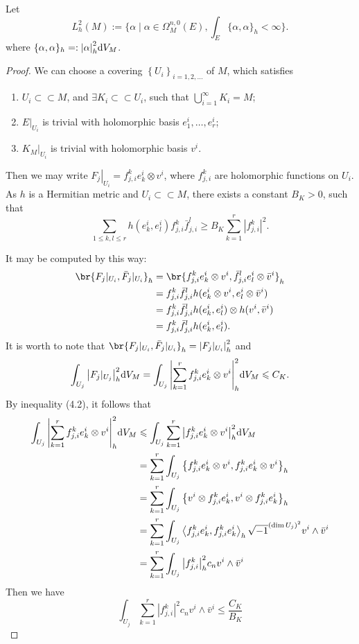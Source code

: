 Let 
\[
  L^2_h(M):=\biggl\{\alpha\mid \alpha\in \Omega^{n,0}_M(E),\int_E \{\alpha,\alpha\}_h<\infty\biggr\}.
\]
where $\{\alpha,\alpha\}_h=:\abs{\alpha}_h^2 \dd V_M$.
\begin{proof}
  We can choose a covering $\left\{U_i\right\}_{i=1,2, \ldots}$ of $M$, which satisfies
  \begin{enumerate}[label=(\arabic*)]
    \item $U_i \subset \subset M$, and $\exists K_i \subset \subset U_i$, such that $\bigcup_{i=1}^{\infty} K_i=M$;
    \item $\left.E\right|_{U_i}$ is trivial with holomorphic basis $e_1^i, \ldots, e_r^i$;
    \item $\left.K_M\right|_{U_i}$ is trivial with holomorphic basis $v^i$.
  \end{enumerate}

Then we may write $\left.F_j\right|_{U_i}=f_{j, i}^k e_k^i \otimes v^i$, where $f_{j, i}^k$ are holomorphic functions on $U_i$. As $h$ is a Hermitian metric and $U_i \subset \subset M$, there exists a constant $B_K>0$, such that
$$
\sum_{1 \leq k, l \leq r} h\left(e_k^i, e_l^i\right) f_{j, i}^k \bar{f}_{j, i}^l \geq B_K \sum_{k=1}^r\left|f_{j, i}^k\right|^2 .
$$

It may be computed by this way:
\begin{align*}
  \br{F_j|_{U_i},\bar{F}_j|_{U_i}}_h &= \br{f_{j, i}^k e_k^i \otimes v^i,\bar{f}_{j, i}^l e_l^i \otimes \bar{v}^i}_h\\ 
  &=f_{j, i}^k\bar{f}_{j, i}^l  h(e_k^i \otimes v^i, e_l^i \otimes \bar{v}^i)\\ 
  &=f_{j, i}^k\bar{f}_{j, i}^l  h(e_k^i , e_l^i )\otimes h(v^i,\bar{v}^i)\\ 
  &=f_{j, i}^k\bar{f}_{j, i}^l  h(e_k^i , e_l^i ).
\end{align*}
  It is worth to note that $\br{F_j|_{U_i},\bar{F}_j|_{U_i}}_h=\abs{F_j|_{U_i}}^2_h$ and \[
    \int_{U_j} \abs{F_{j}|_{U_j}}_h^2 \dd V_M =\int_{U_j} \abs{\sum_{k=1}^r f_{j,i}^k e_k^i \otimes v^i}_h^2 \dd V_M \leqslant C_K.  \]
By inequality (4.2), it follows that
\begin{align*}
  \int_{U_j} \abs{\sum_{k=1}^r f_{j,i}^k e_k^i \otimes v^i}_h^2 \dd V_M &\leqslant\int_{U_j} \sum_{k=1}^r \abs{f_{j,i}^k e_k^i \otimes v^i}_h^2 \dd V_M \\
  &=\sum_{k=1}^r\int_{U_j} \left\{f_{j,i}^k e_k^i \otimes v^i,f_{j,i}^k e_k^i \otimes v^i\right\}_h\\ 
  &=\sum_{k=1}^r\int_{U_j} \left\{ v^i \otimes f_{j,i}^k e_k^i,v^i \otimes f_{j,i}^k e_k^i\right\}_h\\
&=\sum_{k=1}^r\int_{U_j} \left\langle f_{j,i}^k e_k^i,f_{j,i}^k e_k^i\right\rangle_h \sqrt{-1}^{(\dim U_j)^2} v^i\wedge \bar{v}^i\\ 
&=\sum_{k=1}^r\int_{U_j} \abs{f_{j,i}^k}^2_h c_n v^i\wedge \bar{v}^i
\end{align*}
  Then we have
\begin{equation}
  \label{eq:eq4.3}
  \int_{U_j} \sum_{k=1}^r\left|f_{j, i}^k\right|^2 c_n v^i \wedge \bar{v}^i \leq \frac{C_K}{B_K}
\end{equation}
  

\end{proof}
